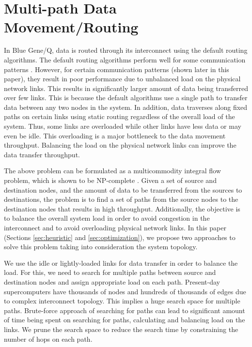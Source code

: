 \section{Multi-path Data Movement/Routing}
\label{sec:approach}


In Blue Gene/Q, data is routed through its interconnect using the default routing algorithms. The default routing algorithms perform well for some communication patterns \cite{Chen:BGQ}. However, for certain communication patterns (shown later in this paper), they result in poor performance due to unbalanced load on the physical network links. This results in significantly larger amount of data being transferred over few links. This is because the default algorithms use a single path to transfer data between any two nodes in the system. In addition, data traverses along fixed paths on certain links using static routing regardless of the overall load of the system. Thus, some links are overloaded while other links have less data or may even be idle. This overloading is a major bottleneck to the data movement throughput. Balancing the load on the physical network links can improve the data transfer throughput. 

The above problem can be formulated as a multicommodity integral flow problem, which is shown to be NP-complete \cite{even1975}. Given a set of source and destination nodes, and the amount of data to be transferred from the sources to destinations, the problem is to find a set of paths from the source nodes to the destination nodes that results in high throughput. Additionally, the objective is to balance the overall system load in order to avoid congestion in the interconnect and to avoid overloading physical network links. In this paper (Sections \ref{sec:heuristic} and \ref{sec:optimization}), we propose two approaches to solve this problem taking into consideration the system topology.  

We use the idle or lightly-loaded links for data transfer in order to balance the load. For this, we need to search for multiple paths between source and destination nodes and assign appropriate load on each path. Present-day supercomputers have thousands of nodes and hundreds of thousands of edges due to complex interconnect topology. This implies a huge search space for multiple paths. Brute-force approach of searching for paths can lead to significant amount of time being spent on searching for paths, calculating and balancing load on the links. We prune the search space to reduce the search time by constraining the number of hops on each path.  

